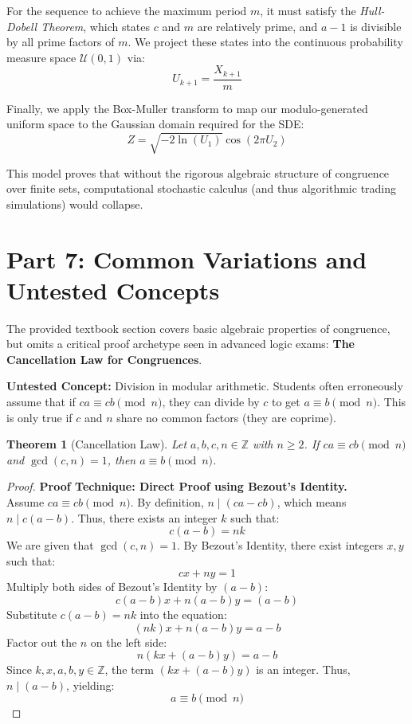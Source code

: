 \documentclass[11pt]{article}
\newtheorem{theorem}{Theorem}[section]
\begin{document}
For the sequence to achieve the maximum period $m$, it must satisfy the \textit{Hull-Dobell Theorem}, which states $c$ and $m$ are relatively prime, and $a - 1$ is divisible by all prime factors of $m$. 
We project these states into the continuous probability measure space $\mathcal{U}(0,1)$ via:
\[ U_{k+1} = \frac{X_{k+1}}{m} \]

Finally, we apply the Box-Muller transform to map our modulo-generated uniform space to the Gaussian domain required for the SDE:
\[ Z = \sqrt{-2 \ln(U_1)} \cos(2\pi U_2) \]

This model proves that without the rigorous algebraic structure of congruence over finite sets, computational stochastic calculus (and thus algorithmic trading simulations) would collapse.

\newpage
\section{Part 7: Common Variations and Untested Concepts}

The provided textbook section covers basic algebraic properties of congruence, but omits a critical proof archetype seen in advanced logic exams: \textbf{The Cancellation Law for Congruences}.

\textbf{Untested Concept:} Division in modular arithmetic. Students often erroneously assume that if $ca \equiv cb \pmod n$, they can divide by $c$ to get $a \equiv b \pmod n$. This is only true if $c$ and $n$ share no common factors (they are coprime).

\begin{theorem}[Cancellation Law]
Let $a, b, c, n \in \mathbb{Z}$ with $n \ge 2$. If $ca \equiv cb \pmod n$ and $\gcd(c, n) = 1$, then $a \equiv b \pmod n$.
\end{theorem}
\begin{proof}
\textbf{Proof Technique: Direct Proof using Bezout's Identity.} \\
Assume $ca \equiv cb \pmod n$. By definition, $n \mid (ca - cb)$, which means $n \mid c(a - b)$. 
Thus, there exists an integer $k$ such that:
\[ c(a - b) = nk \]
We are given that $\gcd(c, n) = 1$. By Bezout's Identity, there exist integers $x, y$ such that:
\[ cx + ny = 1 \]
Multiply both sides of Bezout's Identity by $(a - b)$:
\[ c(a - b)x + n(a - b)y = (a - b) \]
Substitute $c(a - b) = nk$ into the equation:
\[ (nk)x + n(a - b)y = a - b \]
Factor out the $n$ on the left side:
\[ n(kx + (a - b)y) = a - b \]
Since $k, x, a, b, y \in \mathbb{Z}$, the term $(kx + (a - b)y)$ is an integer. Thus, $n \mid (a - b)$, yielding:
\[ a \equiv b \pmod n \]
\end{proof}
\end{document}
